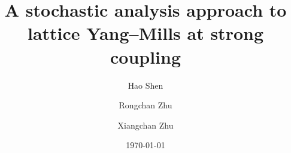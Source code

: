 \documentclass[11pt,UTF-8,reqno]{amsart}
\numberwithin{equation}{section}
\begin{document}
\title{A stochastic analysis approach to  lattice Yang--Mills  at strong coupling}
%
\author{Hao Shen}
\address[H. Shen]{Department of Mathematics, University of Wisconsin - Madison, USA}
%
%
\author{Rongchan Zhu}
\address[R. Zhu]{Department of Mathematics, Beijing Institute of Technology, Beijing 100081, China %
}

\author{Xiangchan Zhu}
\address[X. Zhu]{ Academy of Mathematics and Systems Science,
Chinese Academy of Sciences, Beijing 100190, China%
}








\keywords{}

\date{\today}


















\maketitle
\end{document}
